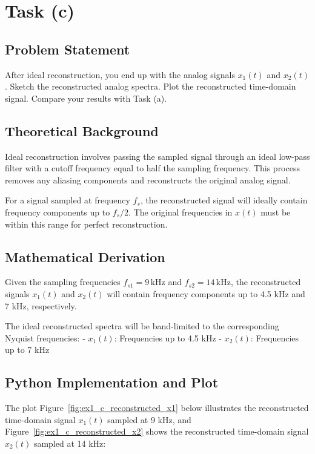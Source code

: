 \item[(c)]
\section*{Task (c)}

\subsection*{Problem Statement}
After ideal reconstruction, you end up with the analog signals \( x_1(t) \) and \( x_2(t) \). Sketch the reconstructed analog spectra. Plot the reconstructed time-domain signal. Compare your results with Task (a).

\subsection*{Theoretical Background}
Ideal reconstruction involves passing the sampled signal through an ideal low-pass filter with a cutoff frequency equal to half the sampling frequency. This process removes any aliasing components and reconstructs the original analog signal.

For a signal sampled at frequency \( f_s \), the reconstructed signal will ideally contain frequency components up to \( f_s / 2 \). The original frequencies in \( x(t) \) must be within this range for perfect reconstruction.

\subsection*{Mathematical Derivation}
Given the sampling frequencies \( f_{s1} = 9 \, \text{kHz} \) and \( f_{s2} = 14 \, \text{kHz} \), the reconstructed signals \( x_1(t) \) and \( x_2(t) \) will contain frequency components up to 4.5 kHz and 7 kHz, respectively.

The ideal reconstructed spectra will be band-limited to the corresponding Nyquist frequencies:
- \( x_1(t) \): Frequencies up to 4.5 kHz
- \( x_2(t) \): Frequencies up to 7 kHz

\subsection*{Python Implementation and Plot}
The plot Figure~\ref{fig:ex1_c_reconstructed_x1} below illustrates the reconstructed time-domain signal \( x_1(t) \) sampled at 9 kHz, and Figure~\ref{fig:ex1_c_reconstructed_x2} shows the reconstructed time-domain signal \( x_2(t) \) sampled at 14 kHz:

